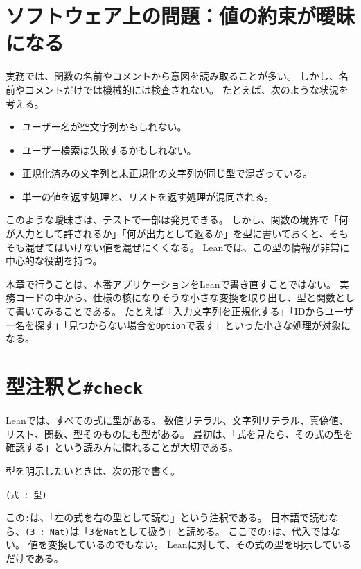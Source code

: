 
\section{ソフトウェア上の問題：値の約束が曖昧になる}

実務では、関数の名前やコメントから意図を読み取ることが多い。
しかし、名前やコメントだけでは機械的には検査されない。
たとえば、次のような状況を考える。

\begin{itemize}
\item ユーザー名が空文字列かもしれない。
\item ユーザー検索は失敗するかもしれない。
\item 正規化済みの文字列と未正規化の文字列が同じ型で混ざっている。
\item 単一の値を返す処理と、リストを返す処理が混同される。
\end{itemize}

このような曖昧さは、テストで一部は発見できる。
しかし、関数の境界で「何が入力として許されるか」「何が出力として返るか」を型に書いておくと、そもそも混ぜてはいけない値を混ぜにくくなる。
Leanでは、この型の情報が非常に中心的な役割を持つ。

\begin{softwarebox}
本章で行うことは、本番アプリケーションをLeanで書き直すことではない。
実務コードの中から、仕様の核になりそうな小さな変換を取り出し、型と関数として書いてみることである。
たとえば「入力文字列を正規化する」「IDからユーザー名を探す」「見つからない場合を\texttt{Option}で表す」といった小さな処理が対象になる。
\end{softwarebox}


\section{型注釈と\texttt{\#check}}

Leanでは、すべての式に型がある。
数値リテラル、文字列リテラル、真偽値、リスト、関数、型そのものにも型がある。
最初は、「式を見たら、その式の型を確認する」という読み方に慣れることが大切である。

型を明示したいときは、次の形で書く。

\begin{center}
\texttt{(式 : 型)}
\end{center}

この\texttt{:}は、「左の式を右の型として読む」という注釈である。
日本語で読むなら、\texttt{(3 : Nat)}は「\texttt{3}を\texttt{Nat}として扱う」と読める。
ここでの\texttt{:}は、代入ではない。
値を変換しているのでもない。
Leanに対して、その式の型を明示しているだけである。

